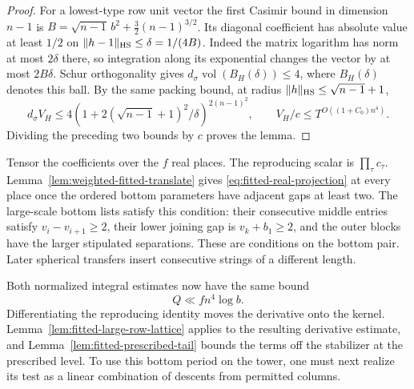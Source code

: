 \begin{proof}
For a lowest-type row unit vector the first Casimir bound in dimension
\(n-1\) is \(B=\sqrt{n-1}\,b^2+\tfrac32(n-1)^{3/2}\).
Its diagonal coefficient has absolute value at least \(1/2\) on
\(\|h-1\|_{\rm HS}\le\delta=1/(4B)\). Indeed the matrix logarithm
has norm at most \(2\delta\) there, so integration along its exponential
changes the vector by at most \(2B\delta\). Schur orthogonality gives
\(d_\sigma\operatorname{vol}(B_H(\delta))\le4\), where \(B_H(\delta)\)
denotes this ball. By the same packing bound, at radius
\(\|h\|_{\rm HS}\le\sqrt{n-1}+1\),
\[
 d_\sigma V_H\le4(1+2(\sqrt{n-1}+1)^2/\delta)^{2(n-1)^2},
 \qquad V_H/c\le T^{O((1+C_0)n^4)} .
\]
Dividing the preceding two bounds by \(c\) proves the lemma.
\end{proof}

Tensor the coefficients over the \(f\) real places. The reproducing
scalar is \(\prod_\tau c_\tau\). Lemma~\ref{lem:weighted-fitted-translate}
gives \eqref{eq:fitted-real-projection} at every place once the
ordered bottom parameters have adjacent gaps at least two. The
large-scale bottom lists satisfy this condition: their consecutive
middle entries satisfy \(v_i-v_{i+1}\ge2\), their lower joining gap
is \(v_k+b_1\ge2\), and the outer blocks have the larger stipulated
separations. These are conditions on the bottom pair. Later spherical
transfers insert consecutive strings of a different length.

Both normalized integral estimates now have the same bound
\[
          Q\ll f n^4\log b .
\]
Differentiating the reproducing identity moves the derivative onto
the kernel. Lemma~\ref{lem:fitted-large-row-lattice} applies to the
resulting derivative estimate, and Lemma~\ref{lem:fitted-prescribed-tail}
bounds the terms off the stabilizer at the prescribed level. To
use this bottom period on the tower, one must next realize its test
as a linear combination of descents from permitted columns.

